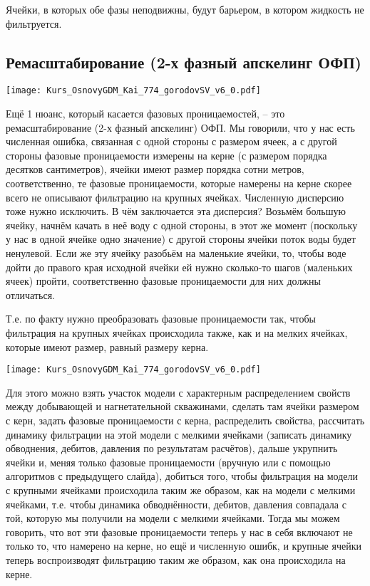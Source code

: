 \documentclass[main.tex]{subfiles}
\begin{document}
Ячейки, в которых обе фазы неподвижны, будут барьером, в котором жидкость не фильтруется.

\subsection{Ремасштабирование (2-х фазный апскелинг ОФП)}

\texttt{[image: Kurs\_OsnovyGDM\_Kai\_774\_gorodovSV\_v6\_0.pdf]}

Ещё 1 нюанс, который касается фазовых проницаемостей, -- это ремасштабирование (2-х фазный апскелинг) ОФП.
Мы говорили, что у нас есть численная ошибка, связанная с одной стороны с размером ячеек, а с другой стороны фазовые проницаемости измерены на керне (с размером порядка десятков сантиметров), ячейки имеют размер порядка сотни метров, соответственно, те фазовые проницаемости, которые намерены на керне скорее всего не описывают фильтрацию на крупных ячейках.
Численную дисперсию тоже нужно исключить.
В чём заключается эта дисперсия?
Возьмём большую ячейку, начнём качать в неё воду с одной стороны, в этот же момент (поскольку у нас в одной ячейке одно значение) с другой стороны ячейки поток воды будет ненулевой.
Если же эту ячейку разобьём на маленькие ячейки, то, чтобы воде дойти до правого края исходной ячейки ей нужно сколько-то шагов (маленьких ячеек) пройти, соответственно фазовые проницаемости для них должны отличаться.

Т.е. по факту нужно преобразовать фазовые проницаемости так, чтобы фильтрация на крупных ячейках происходила также, как и на мелких ячейках, которые имеют размер, равный размеру керна.

\texttt{[image: Kurs\_OsnovyGDM\_Kai\_774\_gorodovSV\_v6\_0.pdf]}

Для этого можно взять участок модели с характерным распределением свойств между добывающей и нагнетательной скважинами, сделать там ячейки размером с керн, задать фазовые проницаемости с керна, распределить свойства, рассчитать динамику фильтрации на этой модели с мелкими ячейками (записать динамику обводнения, дебитов, давления по результатам расчётов), дальше укрупнить ячейки и, меняя только фазовые проницаемости (вручную или с помощью алгоритмов с предыдущего слайда), добиться того, чтобы фильтрация на модели с крупными ячейками происходила таким же образом, как на модели с мелкими ячейками, т.е. чтобы динамика обводнённости, дебитов, давления совпадала с той, которую мы получили на модели с мелкими ячейками.
Тогда мы можем говорить, что вот эти фазовые проницаемости теперь у нас в себя включают не только то, что намерено на керне, но ещё и численную ошибк, и крупные ячейки теперь воспроизводят фильтрацию таким же образом, как она происходила на керне.
\\
\end{document}
